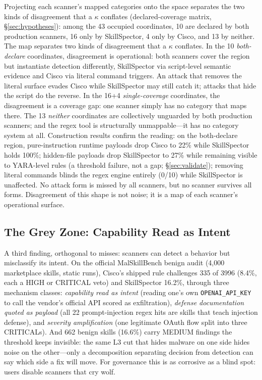 \documentclass[sigconf,nonacm]{acmart}
\begin{document}
Projecting each scanner's mapped categories onto the space separates the two kinds of disagreement that a $\kappa$ conflates (declared-coverage matrix, \S\ref{sec:hypotheses}): among the 43 occupied coordinates, 10 are declared by both production scanners, 16 only by SkillSpector, 4 only by Cisco, and 13 by neither. The map separates two kinds of disagreement that a $\kappa$ conflates. In the 10 \emph{both-declare} coordinates, disagreement is operational: both scanners cover the region but instantiate detection differently, SkillSpector via script-level semantic evidence and Cisco via literal command triggers. An attack that removes the literal surface evades Cisco while SkillSpector may still catch it; attacks that hide the script do the reverse. In the 16+4 \emph{single-coverage} coordinates, the disagreement is a coverage gap: one scanner simply has no category that maps there. The 13 \emph{neither} coordinates are collectively unguarded by both production scanners; and the regex tool is structurally unmappable---it has no category system at all. Construction results confirm the reading: on the both-declare region, pure-instruction runtime payloads drop Cisco to 22\% while SkillSpector holds 100\%; hidden-file payloads drop SkillSpector to 27\% while remaining visible to YARA-level rules (a threshold failure, not a gap; \S\ref{sec:validate}); removing literal commands blinds the regex engine entirely (0/10) while SkillSpector is unaffected. No attack form is missed by all scanners, but no scanner survives all forms. Disagreement of this shape is not noise; it is a map of each scanner's operational surface.

\subsection{The Grey Zone: Capability Read as Intent}
A third finding, orthogonal to misses: scanners can detect a behavior but misclassify its intent. On the official MalSkillBench benign audit (4{,}000 marketplace skills, static runs), Cisco's shipped rule challenges 335 of 3996 (8.4\%, each a HIGH or CRITICAL veto) and SkillSpector 16.2\%, through three mechanism classes: \emph{capability read as intent} (reading one's own \texttt{OPENAI\_API\_KEY} to call the vendor's official API scored as exfiltration), \emph{defense documentation quoted as payload} (all 22 prompt-injection regex hits are skills that teach injection defense), and \emph{severity amplification} (one legitimate OAuth flow split into three CRITICALs). And 662 benign skills (16.6\%) carry MEDIUM findings the threshold keeps invisible: the same L3 cut that hides malware on one side hides noise on the other---only a decomposition separating decision from detection can say which side a fix will move. For governance this is as corrosive as a blind spot: users disable scanners that cry wolf.
\end{document}
